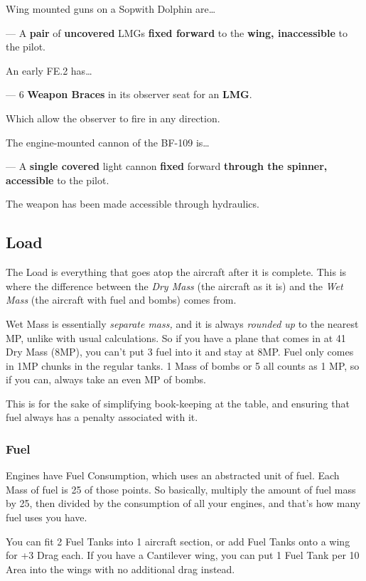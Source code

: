 \documentclass{article}
\begin{document}
Wing mounted guns on a Sopwith Dolphin are\ldots{}

--- A \textbf{pair }of
\textbf{uncovered} LMGs \textbf{fixed forward} to the \textbf{wing, inaccessible} to the pilot.

An early FE.2 has\ldots{}

--- 6 \textbf{Weapon Braces }in its observer seat for
an \textbf{LMG}.

Which allow the observer to fire in any direction.

The engine-mounted cannon of the BF-109 is\ldots{}

--- A \textbf{single covered }light cannon
\textbf{fixed} forward\textbf{ through the
    spinner, accessible }to the pilot.

The weapon has been made accessible through hydraulics.

\subsection{Load}
\label{_Load}

The Load is everything that goes atop the aircraft after it is complete.
This is where the difference between the \emph{Dry Mass} (the aircraft
as it is) and the \emph{Wet Mass} (the aircraft with fuel and bombs)
comes from.

Wet Mass is essentially \emph{separate mass, }and it is always
\emph{rounded up }to the nearest MP, unlike with usual calculations. So
if you have a plane that comes in at 41 Dry Mass (8MP), you can't put 3
fuel into it and stay at 8MP. Fuel only comes in 1MP chunks in the
regular tanks. 1 Mass of bombs or 5 all counts as 1 MP, so if you can,
always take an even MP of bombs.

This is for the sake of simplifying book-keeping at the table, and
ensuring that fuel always has a penalty associated with it.

\subsubsection{Fuel}
\label{_Fuel}

Engines have Fuel Consumption, which uses an abstracted unit of fuel.
Each Mass of fuel is 25 of those points. So basically, multiply the
amount of fuel mass by 25, then divided by the consumption of all your
engines, and that's how many fuel uses you have.

You can fit 2 Fuel Tanks into 1 aircraft section, or add Fuel Tanks onto
a wing for +3 Drag each. If you have a Cantilever wing, you can put 1
Fuel Tank per 10 Area into the wings with no additional drag instead.
\end{document}
